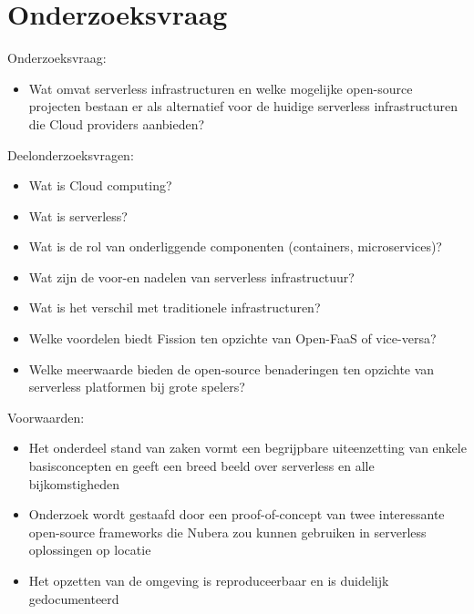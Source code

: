 \section{Onderzoeksvraag}
\label{sec:onderzoeksvraag}


Onderzoeksvraag: 
\begin{itemize}
    \item Wat omvat serverless infrastructuren en welke mogelijke open-source projecten bestaan er als alternatief voor de huidige serverless infrastructuren die Cloud providers aanbieden?
\end{itemize}

Deelonderzoeksvragen: 
\begin{itemize}
    \item Wat is Cloud computing?
    \item Wat is serverless?
    \item Wat is de rol van onderliggende componenten (containers, microservices)?
    \item Wat zijn de voor-en nadelen van serverless infrastructuur?
    \item Wat is het verschil met traditionele infrastructuren?
    \item Welke voordelen biedt Fission ten opzichte van Open-FaaS of vice-versa?
    \item Welke meerwaarde bieden de open-source benaderingen ten opzichte van serverless platformen bij grote spelers?
\end{itemize}

Voorwaarden: 
\begin{itemize}
    \item Het onderdeel stand van zaken vormt een begrijpbare uiteenzetting van enkele basisconcepten en geeft een breed beeld over serverless en alle bijkomstigheden
    \item Onderzoek wordt gestaafd door een proof-of-concept van  twee interessante open-source frameworks die  Nubera zou kunnen gebruiken in serverless oplossingen op locatie
    \item Het opzetten van de omgeving is reproduceerbaar en is duidelijk gedocumenteerd
\end{itemize}




